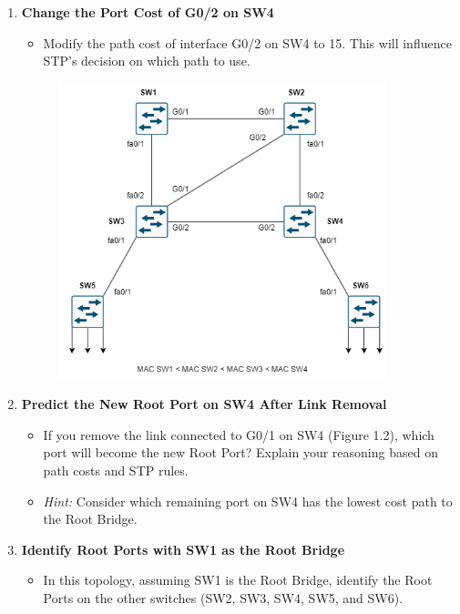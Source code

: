 \documentclass[a4paper]{book}
\begin{document}
\begin{enumerate}
    \item \textbf{Change the Port Cost of G0/2 on SW4}
    \begin{itemize}
        \item Modify the path cost of interface G0/2 on SW4 to 15. This will influence STP’s decision on which path to use. 
    \end{itemize}

    \begin{figure}[h]
        \centering
        \includegraphics[width=0.9\textwidth]{img/stp02.png}
        \caption{\textit{}}
    \end{figure}
    \newpage


    \item \textbf{Predict the New Root Port on SW4 After Link Removal}
    \begin{itemize}
        \item If you remove the link connected to G0/1 on SW4 (Figure 1.2), which port will become the new Root Port? Explain your reasoning based on path costs and STP rules.
        \item \textit{Hint:} Consider which remaining port on SW4 has the lowest cost path to the Root Bridge.
    \end{itemize}

    \item \textbf{Identify Root Ports with SW1 as the Root Bridge}
    \begin{itemize}
        \item In this topology, assuming SW1 is the Root Bridge, identify the Root Ports on the other switches (SW2, SW3, SW4, SW5, and SW6).
 

\end{itemize}
\end{enumerate}
\end{document}
